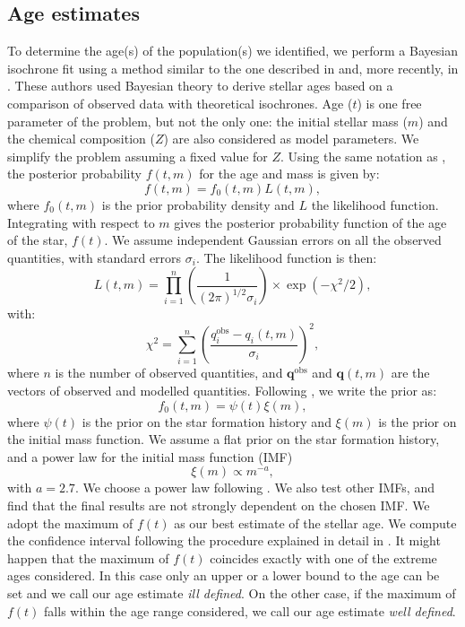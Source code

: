 \documentclass[onecolumn]{aa} %
\begin{document}
\subsection{Age estimates}\label{sec:3.4}
To determine the age(s) of the population(s) we identified, we perform a Bayesian isochrone fit using a method similar to the one described in \citet{Jorgensen2005} and, more recently, in  \citet{Valls-Gabaud2014}.
\noindent
These authors used Bayesian theory to derive stellar ages based on a comparison of observed data with theoretical isochrones. Age ($t$) is one free parameter of the problem, but not the only one: the initial stellar mass ($m$) and the chemical composition ($Z$) are also considered as model parameters. We simplify the problem assuming a fixed value for $Z$. 
Using the same notation as \citet{Jorgensen2005},  the posterior probability $f(t, m)$ for the age and mass is given by:
\begin{equation}
f(t, m) = f_0(t, m)L(t, m),
\end{equation}
where $f_0(t, m)$ is the prior probability density and $L$ the likelihood function. Integrating with respect to $m$ gives the posterior probability function of the age of the star, $f(t)$.   
We assume independent Gaussian errors on all the observed quantities, with standard errors $\sigma_i$. The likelihood function is then:
\begin{equation*}
L(t, m) = \prod_{i=1}^n \left(\frac{1}{(2\pi)^{1/2}\sigma_i}\right) \times \exp{ \left(- \chi^2/2 \right)},
\end{equation*}
with: 
\begin{equation*}
\chi^2 = \sum_{i = 1}^n \left(\frac{q_i^{\mathrm{obs}}-q_i(t, m)}{\sigma_i}\right)^2,
\end{equation*}
where $n$ is the number of observed quantities, and $\mathbf{q}^{\mathrm{obs}}$ and $\mathbf{q}(t, m)$ are the vectors of observed and modelled quantities.
Following \cite{Jorgensen2005}, we write the prior as:
\begin{equation*}
f_0(t, m) = \psi(t)\xi(m),
\end{equation*}
where $\psi(t)$ is the prior on the star formation history and $\xi(m)$ is the prior on the initial mass function. We assume a flat prior on the star formation history, and a power law for the initial mass function (IMF)
\begin{equation*}
\xi(m) \propto m^{-a},
\end{equation*}
with $a = 2.7$. We choose a power law following \cite{Jorgensen2005}. We also test other IMFs, and find that the final results are not strongly dependent on the chosen IMF.
We adopt the maximum of $f(t)$ as our best estimate of the stellar age. We compute the confidence interval following the procedure explained in detail in \cite{Jorgensen2005}. It might happen that the maximum of $f(t)$ coincides exactly with one of the extreme ages considered. In this case only an upper or a lower bound to the age can be set and we call our age estimate \textit{ill defined}. On the other case, if the maximum of $f(t)$ falls within the age range considered, we call our age estimate \textit{well defined}.
\end{document}
